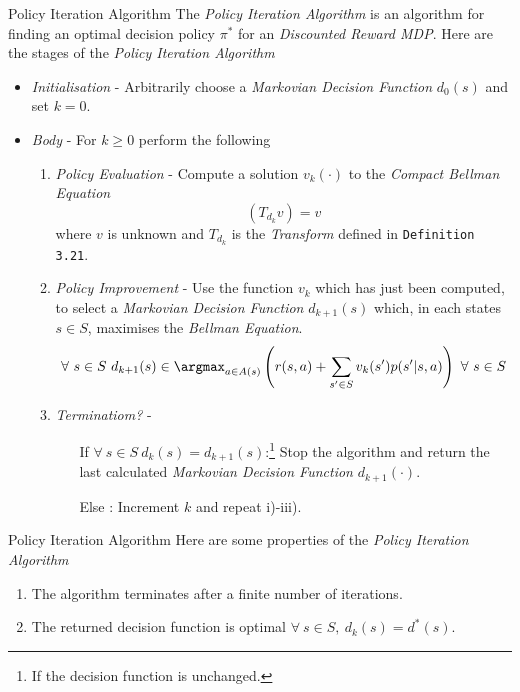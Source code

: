 \documentclass[11pt,a4paper]{article}
\begin{document}
  \begin{definition}{Policy Iteration Algorithm}
    The \textit{Policy Iteration Algorithm} is an algorithm for finding an optimal decision policy $\pi^*$ for an \textit{Discounted Reward MDP}. Here are the stages of the \textit{Policy Iteration Algorithm}
    \begin{itemize}
      \item \textit{Initialisation} - Arbitrarily choose a \textit{Markovian Decision Function} $d_0(s)$ and set $k=0$.
      \item \textit{Body} - For $k\geq0$ perform the following
      \begin{enumerate}
        \item \textit{Policy Evaluation} - Compute a solution $v_k(\cdot)$ to the \textit{Compact Bellman Equation}
        \[ (T_{d_k}v)=v \]
        where $v$ is unknown and $T_{d_k}$ is the \textit{Transform} defined in \texttt{Definition 3.21}.
        \item \textit{Policy Improvement} - Use the function $v_k$ which has just been computed, to select a \textit{Markovian Decision Function} $d_{k+1}(s)$ which, in each states $s\in S$, maximises the \textit{Bellman Equation}.
        \[ \forall\ s\in S\ d_{k+1}(s)\in\argmax_{a\in A(s)}\left(r(s,a)+\sum_{s'\in S}v_k(s')p(s'|s,a)\right)\ \forall\ s\in S \]
        \item \textit{Terminatiom?} -
        \begin{itemize}
          \item[If] $\forall\ s\in S\ d_k(s)=d_{k+1}(s)$:\footnote{If the decision function is unchanged.} Stop the algorithm and return the last calculated \textit{Markovian Decision Function} $d_{k+1}(\cdot)$.
          \item[Else]: Increment $k$ and repeat i)-iii).
        \end{itemize}
      \end{enumerate}
    \end{itemize}
  \end{definition}

  \begin{remark}{Policy Iteration Algorithm}
    Here are some properties of the \textit{Policy Iteration Algorithm}
    \begin{enumerate}
      \item The algorithm terminates after a finite number of iterations.
      \item The returned decision function is optimal $\forall\ s\in S,\ d_k(s)=d^*(s)$.
    \end{enumerate}
  \end{remark}
\end{document}
